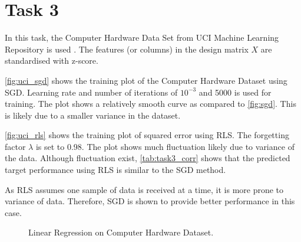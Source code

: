 \documentclass{article}
\begin{document}

\section{Task 3}

In this task, the Computer Hardware Data Set from UCI Machine Learning Repository is used \cite{uci_dataset}. The features (or columns) in the design matrix $X$ are standardised with z-score.

\cref{fig:uci_sgd} shows the training plot of the Computer Hardware Dataset using SGD. Learning rate and number of iterations of $10^{-3}$ and 5000 is used for training. The plot shows a relatively smooth curve as compared to \cref{fig:sgd}. This is likely due to a smaller variance in the dataset.

\cref{fig:uci_rls} shows the training plot of squared error using RLS. The forgetting factor $\lambda$ is set to 0.98. The plot shows much fluctuation likely due to variance of the data. Although fluctuation exist, \cref{tab:task3_corr} shows that the predicted target performance using RLS is similar to the SGD method.

As RLS assumes one sample of data is received at a time, it is more prone to variance of data. Therefore, SGD is shown to provide better performance in this case.

\begin{figure}[h!]
    \caption{Linear Regression on Computer Hardware Dataset.}
    \label{fig:uci}
\end{figure}
\end{document}
